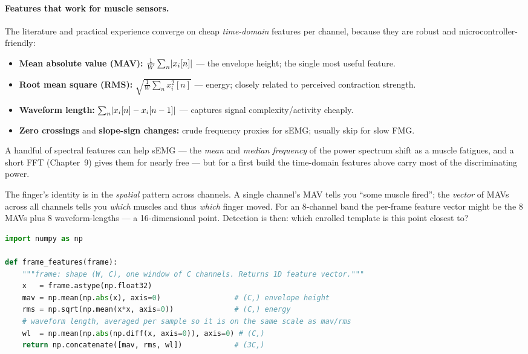 \paragraph{Features that work for muscle sensors.} The literature and practical
experience converge on cheap \emph{time-domain} features per channel,
because they are robust and microcontroller-friendly:

\begin{itemize}
  \item \textbf{Mean absolute value (MAV):}
        $\frac{1}{W}\sum_n \lvert x_i[n]\rvert$ --- the envelope height; the single
        most useful feature.
  \item \textbf{Root mean square (RMS):}
        $\sqrt{\frac{1}{W}\sum_n x_i^2[n]}$ --- energy; closely related to
        perceived contraction strength.
  \item \textbf{Waveform length:} $\sum_n \lvert x_i[n]-x_i[n-1]\rvert$ --- captures
        signal complexity/activity cheaply.
  \item \textbf{Zero crossings} and \textbf{slope-sign changes:} crude frequency
        proxies for sEMG; usually skip for slow FMG.
\end{itemize}

A handful of spectral features can help sEMG --- the \emph{mean} and
\emph{median frequency} of the power spectrum shift as a muscle fatigues, and a
short FFT (Chapter~9) gives them for nearly free --- but for a first build the
time-domain features above carry most of the discriminating power.

\begin{focusbox}
The finger's identity is in the \emph{spatial} pattern across channels. A single
channel's MAV tells you ``some muscle fired''; the \emph{vector} of MAVs across
all channels tells you \emph{which} muscles and thus \emph{which} finger moved.
For an 8-channel band the per-frame feature vector might be the 8 MAVs plus
8 waveform-lengths --- a 16-dimensional point. Detection is then: which enrolled
template is this point closest to?
\end{focusbox}

\begin{lstlisting}[language=Python]
import numpy as np

def frame_features(frame):
    """frame: shape (W, C), one window of C channels. Returns 1D feature vector."""
    x   = frame.astype(np.float32)
    mav = np.mean(np.abs(x), axis=0)                 # (C,) envelope height
    rms = np.sqrt(np.mean(x*x, axis=0))              # (C,) energy
    # waveform length, averaged per sample so it is on the same scale as mav/rms
    wl  = np.mean(np.abs(np.diff(x, axis=0)), axis=0) # (C,)
    return np.concatenate([mav, rms, wl])            # (3C,)
\end{lstlisting}

